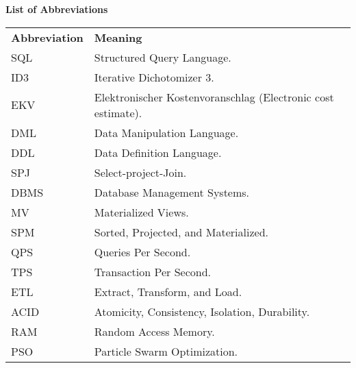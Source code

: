 
% 
\thispagestyle{empty}
\begin{center}
    \huge\textbf{List of Abbreviations}
\end{center}  \vspace{.4cm}

\noindent %
\begin{minipage}{\textwidth}
\begin{tabular}{ll}
    \textbf{Abbreviation} & \textbf{Meaning}\\
    SQL & Structured Query Language. \\
    ID3 & Iterative  Dichotomizer 3. \\
    EKV & Elektronischer Kostenvoranschlag (Electronic cost estimate). \\
    DML & Data Manipulation Language. \\
    DDL & Data Definition Language. \\
    SPJ & Select-project-Join. \\
    DBMS & Database Management Systems. \\
    MV & Materialized Views. \\
    SPM & Sorted, Projected, and Materialized. \\
    QPS & Queries Per Second. \\
    TPS & Transaction Per Second.\\
    ETL & Extract, Transform, and Load.\\
    ACID & Atomicity, Consistency, Isolation, Durability. \\
    RAM & Random Access Memory. \\
    PSO & Particle Swarm Optimization. \\
\end{tabular}
\end{minipage}
% 

    